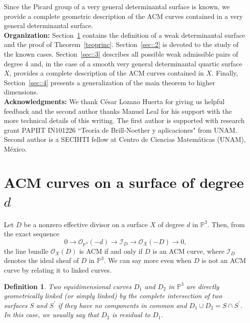 \documentclass[12pt,reqno]{amsart}
\theoremstyle{plain}
\newtheorem{defi}[theorem]{Definition}
\theoremstyle{definition}
\theoremstyle{remark}
\theoremstyle{definition}
\newcommand{\PP}{\mathds{P}}
\newcommand{\PPP}{\PP^{3}}
\newcommand{\ii}{\mathscr{I}}
\newcommand{\oo}{\mathcal{O}}
\begin{document}
Since the Picard group of a very general determinantal surface is known, we provide a complete geometric description of the ACM curves contained in a very general determinantal surface.\\

\textbf{Organization:} Section~\ref{sec::1} contains the definition of a weak determinantal surface and the proof of Theorem~\ref{teoprinc}. Section~\ref{sec::2} is devoted to the study of the known cases. Section~\ref{sec::3} describes all possible weak admissible pairs of degree $4$ and, in the case of a smooth very general determinantal quartic surface $X$, provides a complete description of the ACM curves contained in $X$. Finally, Section~\ref{sec::4} presents a generalization of the main theorem to higher dimensions.\\

\textbf{Acknowledgments:} We thank César Lozano Huerta for giving us helpful feedback and the second author thanks Manuel Leal for his support with the more technical details of this writing. The first author is supported with research grant PAPIIT IN101226 ``Teoría de Brill-Noether y aplicaciones" from UNAM. Second author is a SECIHTI fellow at Centro de Ciencias Matemáticas (UNAM), México.

\section{ACM curves on a surface of degree $d$} \label{sec::1}

Let $D$ be a nonzero effective divisor on a surface $X$ of degree $d$ in $\PPP$. Then, from the exact sequence
\begin{equation} \label{sucideal}
    0 \to \oo_{\PPP}(-d)\to \ii_{D} \to \oo_{X}(-D)\to 0,
\end{equation}
the line bundle $\oo_{X}(D)$ is ACM if and only if $D$ is an ACM curve, where $\ii_{D}$ denotes the ideal sheaf of $D$ in $\PPP$. We can say more even when $D$ is not an ACM curve by relating it to linked curves.

\begin{defi}
Two equidimensional curves $D_{1}$ and $D_{2}$ in $\PP^{3}$ are \textit{directly geometrically linked} (or simply linked) by the complete intersection of two surfaces $S$ and $S^{\prime}$ if they have no components in common and $D_{1}\cup D_{2}=S\cap S^{\prime}$. In this case, we usually say that $D_{2}$ is \textit{residual} to $D_{1}$.
\end{defi}
\end{document}
